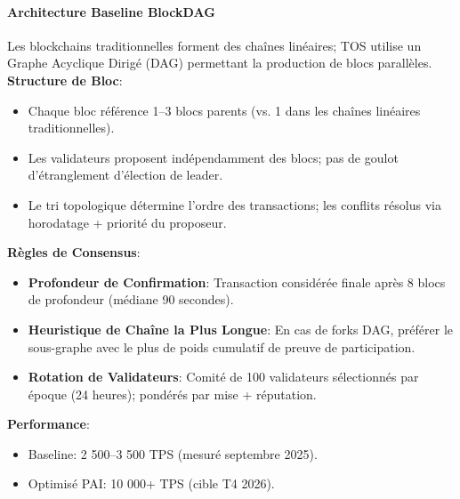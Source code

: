 \documentclass[11pt]{article}
\begin{document}
\paragraph{Architecture Baseline BlockDAG}
Les blockchains traditionnelles forment des chaînes linéaires; TOS utilise un Graphe Acyclique Dirigé (DAG) permettant la production de blocs parallèles.
\textbf{Structure de Bloc}:
\begin{itemize}[noitemsep]
  \item Chaque bloc référence 1--3 blocs parents (vs. 1 dans les chaînes linéaires traditionnelles).
  \item Les validateurs proposent indépendamment des blocs; pas de goulot d'étranglement d'élection de leader.
  \item Le tri topologique détermine l'ordre des transactions; les conflits résolus via horodatage + priorité du proposeur.
\end{itemize}
\textbf{Règles de Consensus}:
\begin{itemize}[noitemsep]
  \item \textbf{Profondeur de Confirmation}: Transaction considérée finale après 8 blocs de profondeur (médiane 90 secondes).
  \item \textbf{Heuristique de Chaîne la Plus Longue}: En cas de forks DAG, préférer le sous-graphe avec le plus de poids cumulatif de preuve de participation.
  \item \textbf{Rotation de Validateurs}: Comité de 100 validateurs sélectionnés par époque (24 heures); pondérés par mise + réputation.
\end{itemize}
\textbf{Performance}:
\begin{itemize}[noitemsep]
  \item Baseline: 2 500--3 500 TPS (mesuré septembre 2025).
  \item Optimisé PAI: 10 000+ TPS (cible T4 2026).
\end{itemize}
\end{document}
